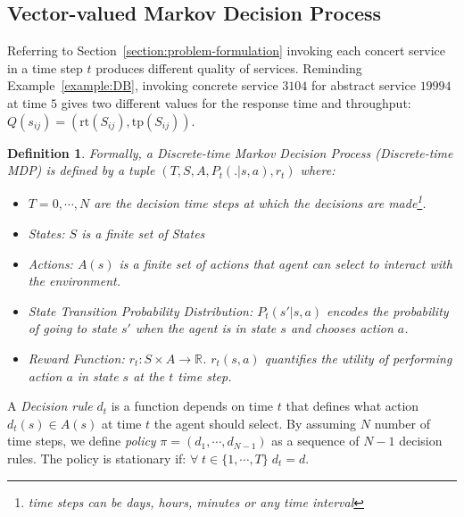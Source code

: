 \documentclass[10pt,journal,compsoc]{IEEEtran}
\newtheorem{definition}{Definition}
\begin{document}
\subsection{Vector-valued Markov Decision Process}
Referring to Section~\ref{section:problem-formulation} invoking each concert service in a time step $t$ produces different quality of services. Reminding Example~\ref{example:DB}, invoking concrete service $3104$ for abstract service $19994$ at time $5$ gives two different values for the response time and throughput: $Q(s_{ij}) = (\text{rt}(S_{ij}), \text{tp}(S_{ij}))$. 

\begin{definition}
Formally, a \emph{Discrete-time Markov Decision Process (Discrete-time MDP)} \cite{timeMDP} is defined by a tuple $(T, S, A, P_t(.|s,a), r_t)$ where:

\begin{itemize}
\item[-] $T=0,\cdots, N$ are the decision time steps at which the decisions are made\footnote{time steps can be days, hours, minutes or any time interval}. 
\item[-]States: $S$ is a finite set of States
\item[-] Actions: $A(s)$ is a finite set of actions that agent can select to interact with the environment.
\item[-] State Transition Probability Distribution: $P_t(s'| s,a)$ encodes the probability of going to state $s'$ when the agent is in state $s$ and chooses action $a$.
\item[-] Reward Function: $r_t : S \times A \longrightarrow \mathbb{R}$. $r_t(s,a)$ quantifies the utility of performing action $a$ in state $s$ at the $t$ time step.
\end{itemize}

\end{definition}

A \emph{Decision rule} $d_t$ is a function depends on time $t$ that defines what action $d_t(s) \in A(s)$ at time $t$ the agent should select. By assuming $N$ number of time steps, we define \emph{policy} $\pi = (d_1, \cdots, d_{N-1})$ as a sequence of $N-1$  decision rules. The policy is stationary if: $\forall \; t \in \{1, \cdots, T \} \; d_t = d$. 
\end{document}
